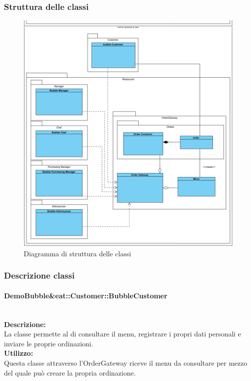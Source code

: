 \begin{samepage}
	\subsubsection{Struttura delle classi}
	\nopagebreak
	\begin{figure}[H]
		\centering
		\includegraphics[width=14cm]{diagrammi_img/classi_e_package/demo_classes.png}
		\caption{Diagramma di struttura delle classi}
	\end{figure}
\end{samepage}

\subsubsection{Descrizione classi}

\paragraph{DemoBubble\&eat\-::Customer\-::Bubble\-Customer}\label{eat-customer}\mbox{}\\
\textbf{Descrizione:}\\
La classe permette al \Customer{} di consultare il menu, registrare i propri dati personali e inviare le proprie ordinazioni.\\
\textbf{Utilizzo:}\\
Questa classe attraverso l'Order\-Gateway riceve il menu da consultare per mezzo del quale può creare la propria ordinazione.\\

